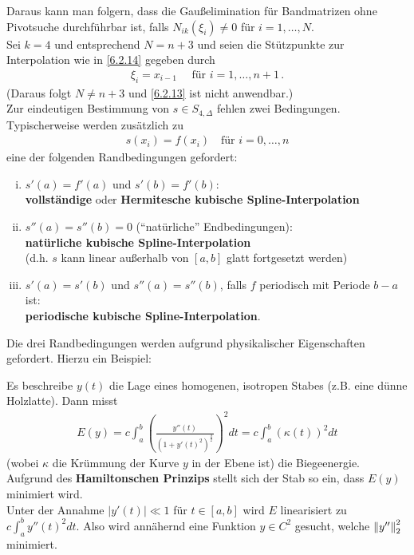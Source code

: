 Daraus kann man folgern, dass
die Gaußelimination für Bandmatrizen ohne Pivotsuche
durchführbar ist, falls $N_{ik}(\xi_i) \neq 0$
für $i =1, \ldots, N$.\\

  
 \label{6.2.15}
Sei $k=4$ und entsprechend $N=n+3$ und 
seien die Stützpunkte zur Interpolation wie in \ref{6.2.14}
gegeben durch 
\begin{gather*}
\xi_i = x_{i-1} \quad \text{ für } i=1, \ldots, n+1\,.
\end{gather*}
(Daraus folgt $N\neq n+3$ und \ref{6.2.13} ist nicht anwendbar.)\\
Zur eindeutigen Bestimmung von $s\in S_{4,\Delta}$ fehlen zwei
Bedingungen.\\
Typischerweise werden 
zusätzlich zu 
\begin{gather*}
s(x_i)=f(x_i) \quad \text{für } i=0,\ldots,n
\end{gather*} 
eine der folgenden Randbedingungen gefordert:
\begin{enumerate}[i)]
\item $s'(a)=f'(a)$ und $s'(b)=f'(b)$:  \\
\textbf{vollständige} oder \textbf{Hermitesche kubische 
Spline-Interpolation} 
\item $s''(a)=s''(b)=0$ (\enquote{natürliche}  Endbedingungen):\\
\textbf{natürliche kubische Spline-Interpolation}\\
(d.h. $s$ kann linear außerhalb von $[a,b]$ glatt fortgesetzt
werden) 
\item $s'(a)=s'(b)$ und $s''(a)=s''(b)$,
falls $f$ periodisch mit Periode $b-a$ ist: \\
\textbf{periodische kubische Spline-Interpolation}.
\end{enumerate}
Die drei Randbedingungen werden aufgrund physikalischer
Eigenschaften gefordert. Hierzu ein Beispiel: 

Es beschreibe $y(t)$ die Lage eines
homogenen, isotropen Stabes (z.B. eine dünne Holzlatte).
Dann misst
\begin{gather*}
  E(y) = c \int_a^b\left(
    \frac{y''(t)}{(1+y'(t)^2)^{\frac{3}{2}}}
  \right)^2dt
  = c \int_a^b\left(
    \kappa(t)
  \right)^2dt
\end{gather*}
(wobei $\kappa $ die Krümmung der Kurve $y$ in der Ebene ist) 
die Biegeenergie.\\
Aufgrund des \textbf{Hamiltonschen Prinzips}
stellt sich der Stab so ein, dass $E(y)$ minimiert wird.\\
Unter der Annahme $|y'(t)| \ll 1$ für $t\in [a,b]$ 
wird $E$ linearisiert zu $c\int_a^by''(t)^2dt$.
Also wird annähernd eine Funktion $y\in C^2$ gesucht,
welche $\left\| y'' \right\|_2^2$ minimiert.

